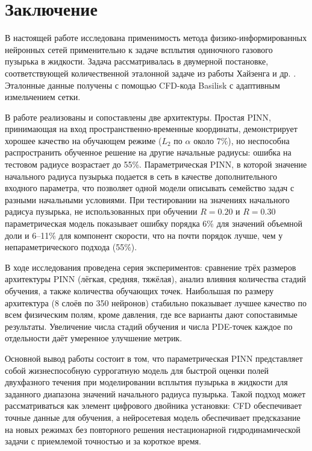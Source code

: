 \documentclass[12pt,a4paper]{article}
\begin{document}
\section{Заключение}

В настоящей работе исследована применимость метода физико-информированных нейронных сетей
применительно к задаче всплытия одиночного газового пузырька в жидкости. Задача
рассматривалась в двумерной постановке, соответствующей количественной
эталонной задаче из работы Хайзенга и др. \cite{Hysing2009}. Эталонные данные получены
с помощью CFD-кода Basilisk с адаптивным измельчением сетки.

В работе реализованы и сопоставлены две архитектуры. Простая PINN, принимающая
на вход пространственно-временные координаты, демонстрирует хорошее качество
на обучающем режиме (\(L_2\) по \(\alpha\) около 7\%), но неспособна
распространить обученное решение на другие начальные радиусы: ошибка на
тестовом радиусе возрастает до 55\%. Параметрическая PINN, в которой значение начального
радиуса пузырька подается в сеть в качестве дополнительного входного параметра, что позволяет
одной модели описывать семейство задач с разными начальными условиями. При
тестировании на значениях начального радисуа пузырька, не использованных при обучении \(R=0.20\) и \(R=0.30\)
параметрическая модель показывает ошибку порядка 6\% для значений объемной доли и 6--11\%
для компонент скорости, что на почти порядок лучше, чем у непараметрического подхода (55\%).

В ходе исследования проведена серия экспериментов:
сравнение трёх размеров архитектуры PINN (лёгкая, средняя, тяжёлая), анализ влияния количества
стадий обучения, а также количества обучающих точек. Наибольшая по размеру
архитектура (8 слоёв по 350 нейронов) стабильно показывает лучшее качество по
всем физическим полям, кроме давления, где все варианты дают сопоставимые
результаты. Увеличение числа стадий обучения и числа PDE-точек каждое по
отдельности даёт умеренное улучшение метрик.

Основной вывод работы состоит в том, что параметрическая PINN представляет
собой жизнеспособную суррогатную модель для быстрой оценки полей двухфазного течения при моделировании всплытия
 пузырька в жидкости для заданного диапазона значений начального радиуса пузырька. Такой подход
может рассматриваться как элемент цифрового двойника установки: CFD обеспечивает
точные данные для обучения, а нейросетевая модель обеспечивает предсказание
на новых режимах без повторного решения нестационарной гидродинамической задачи с приемлемой точностью и за короткое время.
\end{document}
